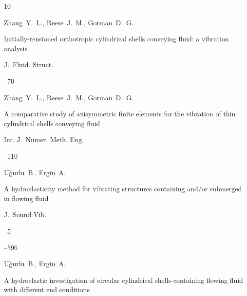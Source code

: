 \begin{thebibliography}{10}




\by Zhang~Y.~L., Reese~J.~M., Gorman~D.~G.

\paper Initially-tensioned orthotropic cylindrical shells conveying fluid: a vibration analysis

\jour J.~Fluid. Struct.




--70






\by Zhang~Y.~L., Reese~J.~M., Gorman~D.~G.

\paper A comparative study of axisymmetric finite elements for the vibration of thin cylindrical shells conveying fluid

\jour Int. J.~Numer. Meth. Eng.




--110






\by U\u{g}urlu~B., Ergin~A.

\paper A hydroelasticity method for vibrating structures containing and/or submerged in flowing fluid

\jour J.~Sound Vib.



--5

--596






\by U\u{g}urlu~B., Ergin~A.

\paper A hydroelastic investigation of circular cylindrical shells-containing flowing fluid with different end conditions


\end{thebibliography}
